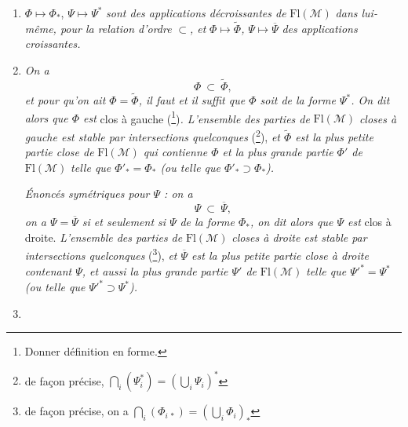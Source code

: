 \documentclass[11pt]{article}
\newcommand{\printedpage}[1]{\marginpar{\footnotesize p.~#1}}
\newcommand{\msp}[1]{\marginpar{\footnotesize [#1]}}
\newcommand{\Fl}{\mathrm{Fl}}
\newcommand{\M}{\mathcal{M}}
\begin{document}
\begin{enumerate}[label={}]
\item[a)] $\Phi \longmapsto \Phi_*$, $\Psi \longmapsto \Psi^*$ \textit{sont des applications décroissantes de} $\Fl(\M)$ \textit{dans lui-même, pour la relation d'ordre} $\subset$\textit{, et} $\Phi \longmapsto \widetilde{\Phi}$\textit{,} $\Psi \longmapsto \overline{\Psi}$ \textit{des applications croissantes.}

\printedpage{2}

\item[b)] \textit{On a}
\[
\Phi\ \subset\ \widetilde{\Phi},
\]
\textit{et pour qu'on ait $\Phi = \widetilde{\Phi}$, il faut et il suffit que $\Phi$ soit de la forme $\Psi^*$. On dit alors que $\Phi$ est} \textup{clos à gauche} (\footnote[2]{Donner définition en forme.})\textit{. L'ensemble des parties de} $\Fl(\M)$ \textit{closes à gauche est stable par intersections quelconques} (\footnote[3]{de façon précise, $\bigcap_i(\Psi_i^*) = (\bigcup_i \Psi_i)^*$}), \textit{et $\widetilde{\Phi}$ est la plus petite partie close de} $\Fl(\M)$ \textit{qui contienne $\Phi$ et la plus grande partie $\Phi'$ de} $\Fl(\M)$ \textit{telle que $\Phi'_* = \Phi_*$ (ou telle que $\Phi'_* \supset \Phi_*$).}

\textit{Énoncés symétriques pour $\Psi$ : on a}
\[
\Psi\ \subset\ \overline{\Psi},
\]
\textit{on a $\Psi = \overline{\Psi}$ si et seulement si $\Psi$} \textit{de la forme $\Phi_*$, on dit alors que $\Psi$ est} \textup{clos à droite.} \textit{L'ensemble des parties de} $\Fl(\M)$ \textit{closes à droite est stable par intersections quelconques} (\footnote[4]{de façon précise, on a $\bigcap_i(\Phi_{i\,*}) = (\bigcup_i \Phi_i)_*$}), \textit{et $\overline{\Psi}$ est la plus petite partie close à droite contenant $\Psi$, et aussi la plus grande partie $\Psi'$ de} $\Fl(\M)$ \textit{telle que $\Psi'^* = \Psi^*$ (ou telle que $\Psi'^* \supset \Psi^*$).}

\item[] \hspace*{-2.5em}\msp{page 3}


\end{enumerate}
\end{document}
